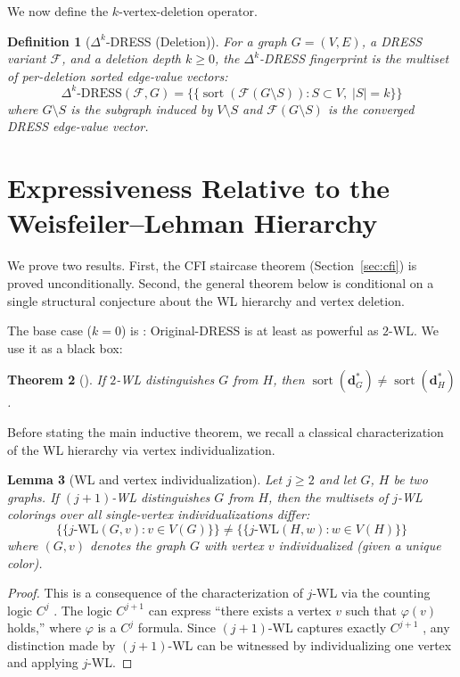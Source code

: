 \documentclass[11pt,a4paper]{article}
\newtheorem{theorem}{Theorem}
\newtheorem{lemma}[theorem]{Lemma}
\newtheorem{definition}[theorem]{Definition}
\begin{document}
We now define the $k$-vertex-deletion operator.

\begin{definition}[$\Delta^k$-DRESS (Deletion)]
\label{def:delta-k}
For a graph $G = (V, E)$, a DRESS variant $\mathcal{F}$, and a deletion depth $k \ge 0$, the $\Delta^k$-DRESS fingerprint is the multiset of per-deletion sorted edge-value vectors:
\[
\Delta^k\text{-DRESS}(\mathcal{F}, G) = \{\!\{ \operatorname{sort}(\mathcal{F}(G \setminus S)) : S \subset V,\; |S| = k \}\!\}
\]
where $G \setminus S$ is the subgraph induced by $V \setminus S$ and $\mathcal{F}(G \setminus S)$ is the converged DRESS edge-value vector.
\end{definition}

\section{Expressiveness Relative to the Weisfeiler--Lehman Hierarchy}

We prove two results. First, the CFI staircase theorem (Section~\ref{sec:cfi}) is proved unconditionally. Second, the general theorem below is conditional on a single structural conjecture about the WL hierarchy and vertex deletion.

The base case ($k=0$) is \cite[Theorem~4]{castrillo2026dress}: Original-DRESS is at least as powerful as $2$-WL. We use it as a black box:

\begin{theorem}[{\cite[Theorem~4]{castrillo2026dress}}]
\label{thm:dress-2wl}
If $2$-WL distinguishes $G$ from $H$, then $\operatorname{sort}(\mathbf{d}^*_G)\neq\operatorname{sort}(\mathbf{d}^*_H)$.
\end{theorem}

Before stating the main inductive theorem, we recall a classical characterization of the WL hierarchy via vertex individualization.

\begin{lemma}[WL and vertex individualization]
\label{lem:wl-individualization}
Let $j \geq 2$ and let $G$, $H$ be two graphs. If $(j+1)$-WL distinguishes $G$ from $H$, then the multisets of $j$-WL colorings over all single-vertex individualizations differ:
\[
\{\!\{ \text{$j$-WL}(G, v) : v \in V(G) \}\!\} \neq \{\!\{ \text{$j$-WL}(H, w) : w \in V(H) \}\!\}
\]
where $(G,v)$ denotes the graph $G$ with vertex $v$ individualized (given a unique color).
\end{lemma}

\begin{proof}
This is a consequence of the characterization of $j$-WL via the counting logic $C^j$ \cite{cai1992optimal, immerman1990describing}. The logic $C^{j+1}$ can express ``there exists a vertex $v$ such that $\varphi(v)$ holds,'' where $\varphi$ is a $C^j$ formula. Since $(j+1)$-WL captures exactly $C^{j+1}$ \cite{cai1992optimal}, any distinction made by $(j+1)$-WL can be witnessed by individualizing one vertex and applying $j$-WL.
\end{proof}
\end{document}
